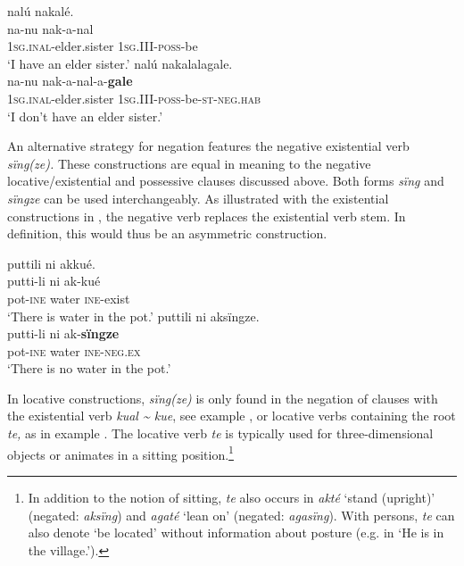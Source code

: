 \documentclass[output=paper,colorlinks,citecolor=brown]{langscibook}
\begin{document}
\ea\label{ex:kog:47}
    \ea\label{ex:kog:47a}nalú nakalé.\\
        \gll  na-nu nak-a-nal\\ 
              \textsc{1sg.inal{}-}elder.sister \textsc{1sg.III{}-poss-}be\\
        \glt ‘I have an elder sister.’
    \ex\label{ex:kog:47b}nalú nakalalagale.\\
        \gll  na-nu nak-a-nal{}-a-\textbf{gale}\\
              \textsc{1sg.inal{}-}elder.sister \textsc{1sg.III{}-poss-}be\textsc{{}-st-neg.hab}\\
        \glt ‘I don't have an elder sister.’
    \z
\z 

An alternative strategy for negation features the negative existential verb \textit{sïng(ze).} These constructions are equal in meaning to the negative locative/existential and possessive clauses discussed above. Both forms \textit{sïng} and \textit{sïngze} can be used interchangeably. As illustrated with the existential constructions in , the negative verb replaces the existential verb stem. In  definition, this would thus be an asymmetric construction.

\ea\label{ex:kog:48}
    \ea\label{ex:kog:48a}puttili ni akkué.\\
        \gll  putti-li ni ak-kué\\
              pot-\textsc{ine} water \textsc{ine-}exist \\
        \glt  ‘There is water in the pot.’
    \ex\label{ex:kog:48b}puttili ni aksïngze.\\
        \gll  putti-li ni ak-\textbf{sïngze}\\
               pot-\textsc{ine} water \textsc{ine-}\textsc{neg.ex}\\
        \glt ‘There is no water in the pot.’
    \z
\z 

In locative constructions, \textit{sïng(ze)} is only found in the negation of clauses with the existential verb \textit{kual {\textasciitilde} kue}, see example , or locative verbs containing the root \textit{te,} as in example . The locative verb \textit{te} is typically used for three-dimensional objects or animates in a sitting position.\footnote{In addition to the notion of sitting, \textit{te} also occurs in \textit{akté} ‘stand (upright)’ (negated: \textit{aksïng}) and \textit{agaté} ‘lean on’ (negated: \textit{agasïng}). With persons, \textit{te} can also denote ‘be located’ without information about posture (e.g. in ‘He is in the village.’).}
\end{document}
